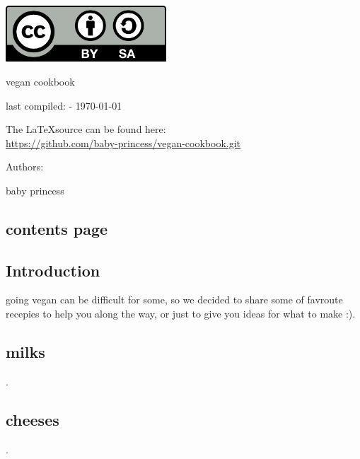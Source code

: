 \documentclass[a4paper,12pt,titlepage]{article}
\begin{document}
\begin{titlepage}
\centering\includegraphics[width=6cm]{CC-SA.png}\\
	\vspace{1.5cm}
	{\huge	vegan cookbook\par}
	
	{\large last compiled: \currenttime	-	\today\par}
	\vspace{1cm}
	{\large The \LaTeX source can be found here:\\	
	\url{https://github.com/baby-princess/vegan-cookbook.git}\par}
	\vspace{3cm}
	{\large Authors:\par}
	{\Large baby princess\\
	\par}
\end{titlepage}
	\newpage
\begin{centering}
\section{contents page}
\end{centering}
\tableofcontents
\newpage
\begin{centering}
\section{Introduction}
\end{centering}
going vegan can be difficult for some, so we decided to share some of favroute recepies to help you along the way, or just to give you ideas for what to make :).

\newpage

% 

\begin{centering}
	\section{milks}
\end{centering}
.

\newpage
\begin{centering}
	\section{cheeses}
\end{centering}
.
\end{document}
